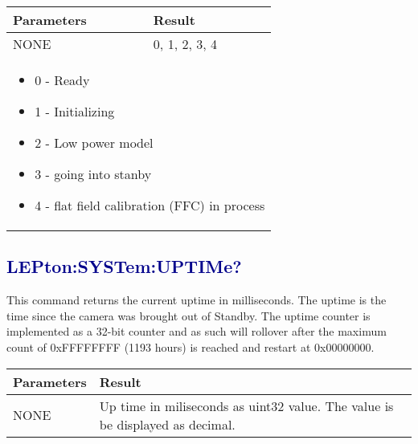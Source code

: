 \documentclass[10pt,a4paper]{article}
\begin{document}
    \begin{table}[h]
        \centering
        \begin{tabularx}{\textwidth}{|X|X|}
            \hline
            \rowcolor{gray!30} 
            Parameters & Result \\
            \hline
            NONE &  0, 1, 2, 3, 4\\
            \hline
            \multicolumn{2}{|X|}{
                \begin{itemize}[label={}, leftmargin=*]
                    \item 0 - Ready
                    \item 1 - Initializing
                    \item 2 - Low power model
                    \item 3 - going into stanby
                    \item 4 - flat field calibration (FFC) in process
                \end{itemize}
            } \\
            \hline
        \end{tabularx}
    \end{table}


\subsection*{\textcolor{darkblue}{LEPton:SYSTem:UPTIMe?}}

\vspace{12pt}

This command returns the current uptime in milliseconds. The uptime is the time since the
camera was brought out of Standby. The uptime counter is implemented as a 32-bit counter
and as such will rollover after the maximum count of 0xFFFFFFFF (1193 hours) is reached and restart at 0x00000000.

    \begin{table}[h]
        \centering
        \begin{tabularx}{\textwidth}{|X|X|}
            \hline
            \rowcolor{gray!30} 
            Parameters & Result \\
            \hline
            NONE &  Up time in miliseconds as uint32 value. The value is be displayed as decimal.\\
            \hline
        \end{tabularx}
    \end{table}
\end{document}

